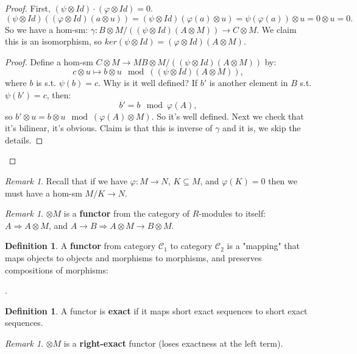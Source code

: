 \documentclass[12pt]{amsbook}
\theoremstyle{plain}
\numberwithin{section}{chapter}
\numberwithin{equation}{chapter}
\theoremstyle{definition}
\newtheorem{Def}[theorem]{Definition}
\theoremstyle{remark}
\newtheorem{rem}[theorem]{Remark}
\newcommand{\sub}{\subseteq}
\newcommand{\tens}{\otimes}
\renewcommand{\phi}{\varphi}
\begin{document}
\begin{proof}
First, $(\psi \tens Id)\cdot(\phi \tens Id) = 0$.
$$
(\psi \tens Id)((\phi \tens Id)(a \tens u)) = (\psi \tens Id)(\phi(a) \tens u) = \psi(\phi(a)) \tens u = 0 \tens u = 0.
$$
So we have a hom-sm: $\gamma:B \tens M/((\psi \tens Id)(A \tens M)) \to C \tens M$. We claim this is an isomorphism, so $ker(\psi \tens Id) = (\phi \tens Id)(A \tens M)$. 
\begin{proof}
Define a hom-sm $C \tens M \to M B \tens M/((\psi \tens Id)(A \tens M))$ by:
$$
c \tens u \mapsto b \tens u \mod ((\psi \tens Id)(A \tens M)),
$$
where $b$ is s.t. $\psi(b) = c$. Why is it well defined? If $b'$ is another element in $B$ s.t. $\psi(b') = c$, then:
$$
b' = b \mod \phi(A),
$$
 so $b' \tens u = b \tens u \mod (\phi(A) \tens M)$. So it's well defined. Next we check that it's bilinear, it's obvious. Claim is that this is inverse of $\gamma$ and it is, we skip the details. 
\end{proof}
\end{proof}

\begin{rem}
Recall that if we have $\phi:M \to N$, $K \sub M$, and $\phi(K) = 0$ then we must have a hom-sm $M/K \to N$. 
\end{rem}

\begin{rem}
$\tens M$ is a \textbf{functor} from the category of $R$-modules to itself:
$A \Rightarrow A \tens M$, and $A \to B \Rightarrow A \tens M \to B \tens M$. 
\end{rem}

\begin{Def}
A \textbf{functor} from category $\mathcal{C}_1$ to category $\mathcal{C}_2$ is a "mapping" that maps objects to objects and morphisms to morphisms, and preserves compositions of morphisms:
\begin{center}
.
\end{center}
\end{Def}

\begin{Def}
A functor is \textbf{exact} if it maps short exact sequences to short exact sequences. 
\end{Def}

\begin{rem}
$\tens M$ is a \textbf{right-exact} functor (loses exactness at the left term). 
\end{rem}
\end{document}
